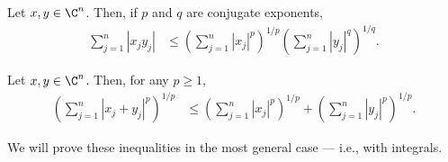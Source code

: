 \documentclass[12pt]{mypackage}
\begin{document}
\begin{theorem}
  Let $x,y\in \C^{n}$. Then, if $p$ and $q$ are conjugate exponents,
  \begin{align*}
    \sum_{j=1}^{n}\left\vert x_jy_j \right\vert &\leq \left( \sum_{j=1}^{n}\left\vert x_j \right\vert^{p} \right)^{1/p}\left( \sum_{j=1}^{n}\left\vert y_j \right\vert^{q} \right)^{1/q}.
  \end{align*}
\end{theorem}
\begin{theorem}
  Let $x,y\in \C^n$. Then, for any $p \geq 1$,
  \begin{align*}
    \left( \sum_{j=1}^{n}\left\vert x_j + y_j \right\vert^{p} \right)^{1/p} &\leq \left( \sum_{j=1}^{n}\left\vert x_j \right\vert^{p} \right)^{1/p} + \left( \sum_{j=1}^{n}\left\vert y_j \right\vert^{p} \right)^{1/p}.
  \end{align*}
\end{theorem}
We will prove these inequalities in the most general case --- i.e., with integrals.
\end{document}
